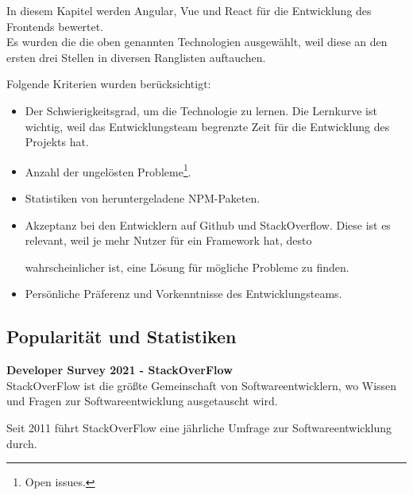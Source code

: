 \begin{flushleft}
In diesem Kapitel werden Angular, Vue und React für die Entwicklung des Frontends bewertet.
\\
Es wurden die die oben genannten Technologien ausgewählt, weil diese an den ersten drei Stellen in diversen Ranglisten auftauchen{\cite{SO01, JS1}}.

  Folgende Kriterien wurden berücksichtigt:
  \begin{itemize}
    \item
          Der Schwierigkeitsgrad, um die Technologie zu lernen. 
          Die Lernkurve ist wichtig, weil das Entwicklungsteam begrenzte Zeit für die Entwicklung des Projekts hat. 

    \item
          Anzahl der ungelösten Probleme\footnote{Open issues.}. 

    \item
          Statistiken von heruntergeladene NPM-Paketen.

    \item
          Akzeptanz bei den Entwicklern auf Github und StackOverflow. 
          Diese ist es relevant, weil je mehr Nutzer für ein Framework hat, desto 
          
          wahrscheinlicher ist, eine Lösung für mögliche Probleme zu finden.

    \item
          Persönliche Präferenz und Vorkenntnisse des Entwicklungsteams.
  \end{itemize}

\end{flushleft}

\newpage    
\subsection{Popularität und Statistiken}
\begin{flushleft}
  \textbf{Developer Survey 2021 - StackOverFlow}\\
  StackOverFlow ist die größte Gemeinschaft von Softwareentwicklern, wo Wissen und Fragen zur Softwareentwicklung ausgetauscht wird.

  Seit 2011 führt StackOverFlow eine jährliche Umfrage zur Softwareentwicklung durch.
\end{flushleft}

